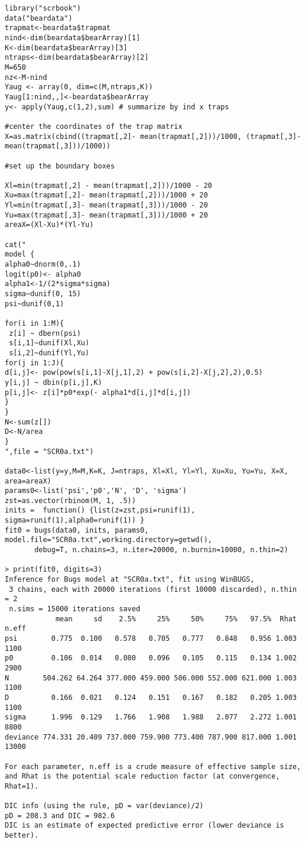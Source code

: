 {\small
\begin{verbatim}
library("scrbook")
data("beardata")
trapmat<-beardata$trapmat
nind<-dim(beardata$bearArray)[1]
K<-dim(beardata$bearArray)[3]
ntraps<-dim(beardata$bearArray)[2]
M=650
nz<-M-nind
Yaug <- array(0, dim=c(M,ntraps,K))
Yaug[1:nind,,]<-beardata$bearArray 
y<- apply(Yaug,c(1,2),sum) # summarize by ind x traps

#center the coordinates of the trap matrix
X=as.matrix(cbind((trapmat[,2]- mean(trapmat[,2]))/1000, (trapmat[,3]- mean(trapmat[,3]))/1000))

#set up the boundary boxes

Xl=min(trapmat[,2] - mean(trapmat[,2]))/1000 - 20
Xu=max(trapmat[,2]- mean(trapmat[,2]))/1000 + 20
Yl=min(trapmat[,3]- mean(trapmat[,3]))/1000 - 20
Yu=max(trapmat[,3]- mean(trapmat[,3]))/1000 + 20
areaX=(Xl-Xu)*(Yl-Yu)

cat("
model {
alpha0~dnorm(0,.1)
logit(p0)<- alpha0
alpha1<-1/(2*sigma*sigma)
sigma~dunif(0, 15)
psi~dunif(0,1)

for(i in 1:M){
 z[i] ~ dbern(psi)
 s[i,1]~dunif(Xl,Xu)
 s[i,2]~dunif(Yl,Yu)
for(j in 1:J){
d[i,j]<- pow(pow(s[i,1]-X[j,1],2) + pow(s[i,2]-X[j,2],2),0.5)
y[i,j] ~ dbin(p[i,j],K)
p[i,j]<- z[i]*p0*exp(- alpha1*d[i,j]*d[i,j])
}
}
N<-sum(z[])
D<-N/area
}
",file = "SCR0a.txt")

data0<-list(y=y,M=M,K=K, J=ntraps, Xl=Xl, Yl=Yl, Xu=Xu, Yu=Yu, X=X, area=areaX)
params0<-list('psi','p0','N', 'D', 'sigma')
zst=as.vector(rbinom(M, 1, .5))
inits =  function() {list(z=zst,psi=runif(1), sigma=runif(1),alpha0=runif(1)) }
fit0 = bugs(data0, inits, params0, model.file="SCR0a.txt",working.directory=getwd(),    
       debug=T, n.chains=3, n.iter=20000, n.burnin=10000, n.thin=2)

> print(fit0, digits=3)
Inference for Bugs model at "SCR0a.txt", fit using WinBUGS,
 3 chains, each with 20000 iterations (first 10000 discarded), n.thin = 2
 n.sims = 15000 iterations saved
            mean     sd    2.5%     25%     50%     75%   97.5%  Rhat n.eff
psi        0.775  0.100   0.578   0.705   0.777   0.848   0.956 1.003  1100
p0         0.106  0.014   0.080   0.096   0.105   0.115   0.134 1.002  2900
N        504.262 64.264 377.000 459.000 506.000 552.000 621.000 1.003  1100
D          0.166  0.021   0.124   0.151   0.167   0.182   0.205 1.003  1100
sigma      1.996  0.129   1.766   1.908   1.988   2.077   2.272 1.001  8800
deviance 774.331 20.409 737.000 759.900 773.400 787.900 817.000 1.001 13000

For each parameter, n.eff is a crude measure of effective sample size,
and Rhat is the potential scale reduction factor (at convergence, Rhat=1).

DIC info (using the rule, pD = var(deviance)/2)
pD = 208.3 and DIC = 982.6
DIC is an estimate of expected predictive error (lower deviance is better).
\end{verbatim}
}
